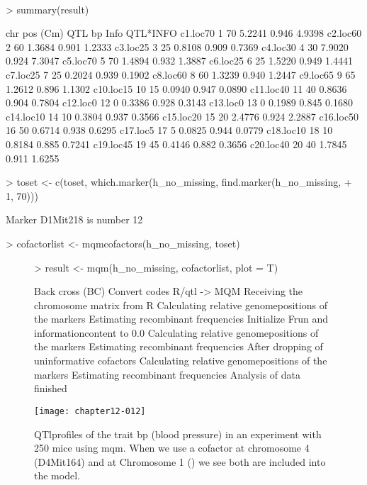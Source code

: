 \documentclass[11pt]{article}
\begin{document}
\\
\begin{Schunk}
\begin{Sinput}
> summary(result)
\end{Sinput}
\begin{Soutput}
          chr pos (Cm) QTL bp  Info QTL*INFO
c1.loc70    1       70 5.2241 0.946   4.9398
c2.loc60    2       60 1.3684 0.901   1.2333
c3.loc25    3       25 0.8108 0.909   0.7369
c4.loc30    4       30 7.9020 0.924   7.3047
c5.loc70    5       70 1.4894 0.932   1.3887
c6.loc25    6       25 1.5220 0.949   1.4441
c7.loc25    7       25 0.2024 0.939   0.1902
c8.loc60    8       60 1.3239 0.940   1.2447
c9.loc65    9       65 1.2612 0.896   1.1302
c10.loc15  10       15 0.0940 0.947   0.0890
c11.loc40  11       40 0.8636 0.904   0.7804
c12.loc0   12        0 0.3386 0.928   0.3143
c13.loc0   13        0 0.1989 0.845   0.1680
c14.loc10  14       10 0.3804 0.937   0.3566
c15.loc20  15       20 2.4776 0.924   2.2887
c16.loc50  16       50 0.6714 0.938   0.6295
c17.loc5   17        5 0.0825 0.944   0.0779
c18.loc10  18       10 0.8184 0.885   0.7241
c19.loc45  19       45 0.4146 0.882   0.3656
c20.loc40  20       40 1.7845 0.911   1.6255
\end{Soutput}
\begin{Sinput}
> toset <- c(toset, which.marker(h_no_missing, find.marker(h_no_missing, 
+     1, 70)))
\end{Sinput}
\begin{Soutput}
Marker D1Mit218 is number 12 
\end{Soutput}
\begin{Sinput}
> cofactorlist <- mqmcofactors(h_no_missing, toset)
\end{Sinput}
\end{Schunk}
\begin{figure}[h]
\begin{Schunk}
\begin{Sinput}
> result <- mqm(h_no_missing, cofactorlist, plot = T)
\end{Sinput}
\begin{Soutput}
Back cross (BC)
Convert codes R/qtl -> MQM
Receiving the chromosome matrix from R
Calculating relative genomepositions of the markers
Estimating recombinant frequencies
Initialize Frun and informationcontent to 0.0
Calculating relative genomepositions of the markers
Estimating recombinant frequencies
After dropping of uninformative cofactors
Calculating relative genomepositions of the markers
Estimating recombinant frequencies
Analysis of data finished
\end{Soutput}
\end{Schunk}
\texttt{[image: chapter12-012]}
\caption{QTlprofiles of the trait bp (blood pressure) in an experiment with 250 mice using mqm. When we use a cofactor at chromosome 4 (D4Mit164) and at Chromosome 1 () we see both are included into the model.}
\end{figure}
\end{document}
